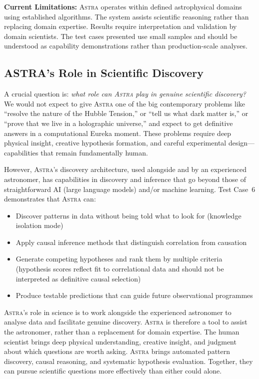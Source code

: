 \documentclass[usenatbib]{rasti}
\newcommand{\astra}{\textsc{Astra}\xspace}
\begin{document}
\textbf{Current Limitations:}
\astra operates within defined astrophysical domains using established algorithms.
The system assists scientific reasoning rather than replacing domain expertise.
Results require interpretation and validation by domain scientists.
The test cases presented use small samples and should be understood as capability demonstrations rather than production-scale analyses.

\subsection{ASTRA's Role in Scientific Discovery}
\label{sec:discussion:role}

A crucial question is: \emph{what role can \astra play in genuine scientific discovery?}
We would not expect to give \astra one of the big contemporary problems like ``resolve the nature of the Hubble Tension,'' or ``tell us what dark matter is,'' or ``prove that we live in a holographic universe,'' and expect to get definitive answers in a computational Eureka moment.
These problems require deep physical insight, creative hypothesis formation, and careful experimental design---capabilities that remain fundamentally human.

However, \astra's discovery architecture, used alongside and by an experienced astronomer, has capabilities in discovery and inference that go beyond those of straightforward AI (large language models) and/or machine learning.
Test Case~6 demonstrates that \astra can:
\begin{itemize}
  \item Discover patterns in data without being told what to look for (knowledge isolation mode)
  \item Apply causal inference methods that distinguish correlation from causation
  \item Generate competing hypotheses and rank them by multiple criteria (hypothesis scores reflect fit to correlational data and should not be interpreted as definitive causal selection)
  \item Produce testable predictions that can guide future observational programmes
\end{itemize}

\astra's role in science is to work alongside the experienced astronomer to analyse data and facilitate genuine discovery.
\astra is therefore a tool to assist the astronomer, rather than a replacement for domain expertise.
The human scientist brings deep physical understanding, creative insight, and judgment about which questions are worth asking.
\astra brings automated pattern discovery, causal reasoning, and systematic hypothesis evaluation.
Together, they can pursue scientific questions more effectively than either could alone.
\end{document}
